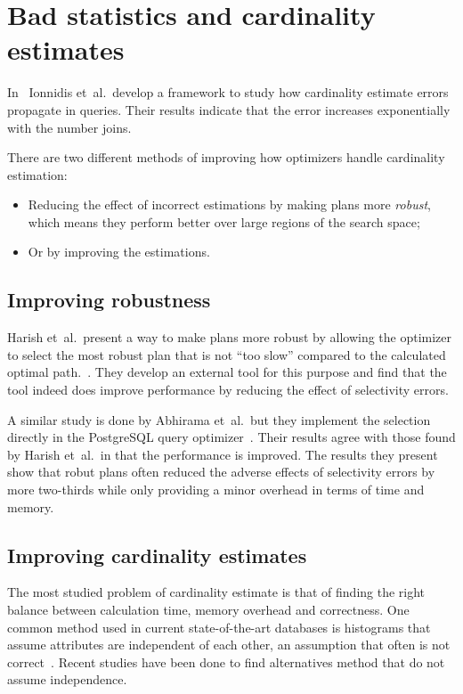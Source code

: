\section{Bad statistics and cardinality estimates}
In~\cite{ioannidis_1991_propagation_otpoeitsojr} Ionnidis  et\ al.\ develop a
framework to study how cardinality estimate errors propagate in queries. Their
results indicate that the error increases exponentially with the number joins.

There are two different methods of improving how optimizers handle cardinality
estimation:
\begin{itemize}
\item Reducing the effect of incorrect estimations by making plans more
  \textit{robust}, which means they perform better over large regions of the
  search space;
\item Or by improving the estimations.
\end{itemize}

\subsection{Improving robustness}
Harish et\ al.\ present a way to make plans more robust by allowing the
optimizer to select the most robust plan that is not ``too slow'' compared to
the calculated optimal path.~\cite{harish_2008_identifying_irptpdr}. They
develop an external tool for this purpose and find that the tool indeed does
improve performance by reducing the effect of selectivity errors.

A similar study is done by Abhirama et\ al.\ but they implement the selection
directly in the PostgreSQL query
optimizer~\cite{abhirama_2010_stability_otsopcatcops}. Their results agree with
those found by Harish  et\ al.\ in that the performance is improved. The results
they present show that robut plans often reduced the adverse effects of
selectivity errors by more two-thirds while only providing a minor overhead in
terms of time and memory.

\subsection{Improving cardinality estimates}
The most studied problem of cardinality estimate is that of finding the right
balance between calculation time, memory overhead and correctness. One common
method used in current state-of-the-art databases is histograms that assume
attributes are independent of each other, an assumption that often is not
correct~\cite{ioannidis_2003_history_thoha}. Recent studies have been done to
find alternatives method that do not assume independence.

